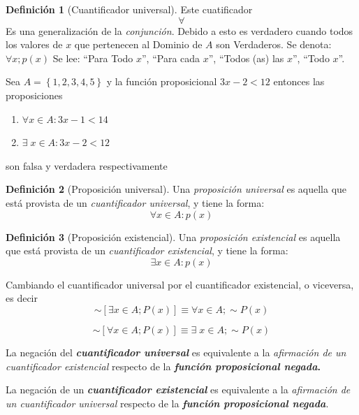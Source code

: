 \documentclass[
  16pt,
]{krantz}
\providecommand{\tightlist}{%
  \setlength{\itemsep}{0pt}\setlength{\parskip}{0pt}}
\theoremstyle{definition}
\newtheorem{definition}{Definición}[chapter]
\theoremstyle{definition}
\theoremstyle{definition}
\theoremstyle{definition}
\theoremstyle{remark}
\begin{document}
\begin{definition}[Cuantificador universal]
\protect\hypertarget{def:universal}{}\label{def:universal}Este cuatificador
\[\forall\]
Es una generalización de la \emph{conjunción}. Debido a esto es verdadero cuando todos los valores de \(x\) que pertenecen al Dominio de \(A\) son Verdaderos. Se denota: \(\forall x ; p(x)\) Se lee: ``Para Todo \(x\)'', ``Para cada \(x\)'', ``Todos (as) las \(x\)'', ``Todo \(x\)''.
\end{definition}

Sea \(A=\left\{1,2,3,4,5\right\}\) y la función proposicional \(3x-2<12\) entonces las proposiciones

\begin{enumerate}
\def\labelenumi{\arabic{enumi}.}
\tightlist
\item
  \(\forall x\in A:3x-1<14\)
\item
  \(\exists\; x\in A:3x-2<12\)
\end{enumerate}

son falsa y verdadera respectivamente

\begin{definition}[Proposición universal]
\protect\hypertarget{def:universal2}{}\label{def:universal2}Una \emph{proposición universal} es aquella que está provista de un \emph{cuantificador universal}, y tiene la forma: \[\forall x\in A:p(x)\]
\end{definition}

\begin{definition}[Proposición existencial]
\protect\hypertarget{def:existencial2}{}\label{def:existencial2}Una \emph{proposición existencial} es aquella que está provista de un \emph{cuantificador existencial}, y tiene la forma: \[\exists x\in A:p(x)\]
\end{definition}

Cambiando el cuantificador universal por el cuantificador existencial, o viceversa, es decir \[\sim[\exists x\in A; P(x)]\equiv\forall x\in A;\sim P(x)\]

\[
\sim\left[\forall  x\in A; P(x)\right]\equiv\exists\; x\in A;\sim P(x)
\]

La negación del \textbf{\emph{cuantificador universal}} es equivalente a la \emph{afirmación de un cuantificador existencial} respecto de la \textbf{\emph{función proposicional negada}.}

La negación de un \textbf{\emph{cuantificador existencial}} es equivalente a la \emph{afirmación de un cuantificador universal} respecto de la \textbf{\emph{función proposicional negada}}.
\end{document}
